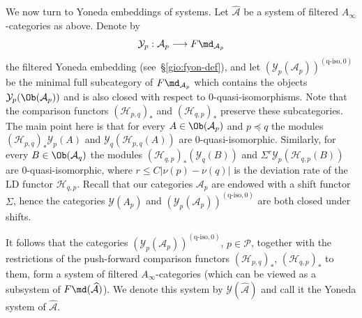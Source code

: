 We now turn to Yoneda embeddings of systems. Let
$\widehat{\mathcal{A}}$ be a system of filtered
$A_{\infty}$-categories as above. Denote by 
$$\mathcal{Y}_p: \mathcal{A}_p \longrightarrow F\md_{\mathcal{A}_p}$$ 
the filtered Yoneda embedding (see~\S\ref{gio:fyon-def}), and let
$(\mathcal{Y}_p(\mathcal{A}_p))^{(\text{q-iso},0)}$ be the minimal
full subcategory of $F\md_{\mathcal{A}_p}$ which contains the objects
$\mathcal{Y}_p(\Ob(\mathcal{A}_p))$ and is also closed with respect to
$0$-quasi-isomorphisms. Note that the comparison functors
$(\mathcal{H}_{p,q})_*$ and $(\mathcal{H}_{q,p})_*$ preserve these
subcategories. The main point here is that for every
$A \in \Ob(\mathcal{A}_p)$ and $p \preceq q$ the modules
$(\mathcal{H}_{p,q})_* \mathcal{Y}_p(A)$ and
$\mathcal{Y}_q(\mathcal{H}_{p,q}(A))$ are
$0$-quasi-isomorphic. Similarly, for every $B \in \Ob(\mathcal{A}_q)$
the modules $(\mathcal{H}_{q,p})_*(\mathcal{Y}_q(B))$ and
$\Sigma^r \mathcal{Y}_p(\mathcal{H}_{q,p}(B))$ are
$0$-quasi-isomorphic, where $r \leq C |\nu(p) - \nu(q)|$ is the
deviation rate of the LD functor $\mathcal{H}_{q,p}$. Recall that our
categories $\mathcal{A}_p$ are endowed with a shift functor $\Sigma$,
hence the categories $\mathcal{Y}(A_p)$ and
$(\mathcal{Y}_p(\mathcal{A}_p))^{(\text{q-iso},0)}$ are both closed
under shifts.

It follows that the categories
$(\mathcal{Y}_p(\mathcal{A}_p))^{(\text{q-iso},0)}$,
$p \in \mathcal{P}$, together with the restrictions of the
push-forward comparison functors $(\mathcal{H}_{p,q})_*$,
$(\mathcal{H}_{q,p})_*$ to them, form a system of filtered
$A_{\infty}$-categories (which can be viewed as a subsystem of
$F\md(\widehat{\mathcal{A}})$). We denote this system by
$\mathcal{Y}(\widehat{\mathcal{A}})$ and call it the Yoneda system of
$\widehat{\mathcal{A}}$.

